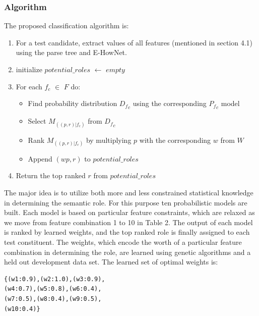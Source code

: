 \documentclass[11pt]{article}
\begin{document}
\subsubsection*{Algorithm}
The proposed classification algorithm is:
\begin{enumerate}
\item For a test candidate, extract values of all features (mentioned in section 4.1) using the parse tree and E-HowNet.
\item initialize $potential\_roles$  $\leftarrow$ $empty$ 
\item For each $f_c$  $\in$ $F$ do:
\begin{itemize}
 \item Find probability distribution ${D_f}_c$ using the corresponding ${P_f}_c$ model
 \item Select $M_{((p,r)|f_c)}$ from ${D_f}_c$
 \item Rank $M_{((p,r)|f_c)}$ by multiplying $p$ with the corresponding $w$ from $W$
 \item Append $(wp,r)$ to $potential\_roles$
 \end{itemize}
\item Return the top ranked $r$ from $potential\_roles$
 \end{enumerate}
The major idea is to utilize both more and less constrained statistical knowledge in determining the semantic role. For this purpose ten probabilistic models are built. Each model is based on particular feature constraints, which are relaxed as we move from feature combination 1 to 10 in Table 2. The output of each model is ranked by learned weights, and the top ranked role is finally assigned to each test constituent. The weights, which encode the worth of a particular feature combination in determining the role, are learned using genetic algorithms and a held out development data set. The learned set of optimal weights is: %
\begin{verbatim}
{(w1:0.9),(w2:1.0),(w3:0.9),
(w4:0.7),(w5:0.8),(w6:0.4),
(w7:0.5),(w8:0.4),(w9:0.5),
(w10:0.4)}
\end{verbatim} 
\end{document}
